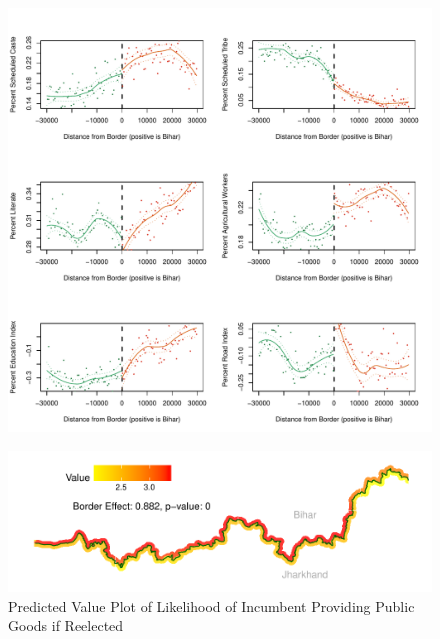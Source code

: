 \documentclass[xcolor=x11names,compress]{beamer}\usepackage[]{graphicx}\usepackage[]{color}
\makeatletter
\def\maxwidth{ %
  \ifdim\Gin@nat@width>\linewidth
    \linewidth
  \else
    \Gin@nat@width
  \fi
}
\renewcommand{\(}{\begin{columns}}
\renewcommand{\)}{\end{columns}}
\newcommand{\<}[1]{\begin{column}{#1}}
\renewcommand{\>}{\end{column}}
\makeatother
\begin{document}
\begin{frame}
\begin{figure}
\includegraphics[width=\maxwidth]{figure/rdd_01-1.pdf}
\end{figure}
\end{frame}

\begin{frame}
\begin{figure}
\includegraphics[width=\maxwidth]{figure/rdd_map_incumb_dist_pg-1} \caption[Predicted Value Plot of Likelihood of Incumbent Providing Public Goods if Reelected]{Predicted Value Plot of Likelihood of Incumbent Providing Public Goods if Reelected}\label{fig:rdd_map_incumb_dist_pg}
\end{figure}
\end{frame}
\end{document}
